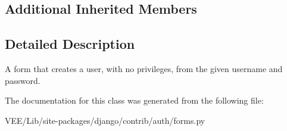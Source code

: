 \subsection*{Additional Inherited Members}


\subsection{Detailed Description}
\begin{DoxyVerb}A form that creates a user, with no privileges, from the given username and
password.
\end{DoxyVerb}
 

The documentation for this class was generated from the following file\+:\begin{DoxyCompactItemize}
\item 
V\+E\+E/\+Lib/site-\/packages/django/contrib/auth/forms.\+py\end{DoxyCompactItemize}

